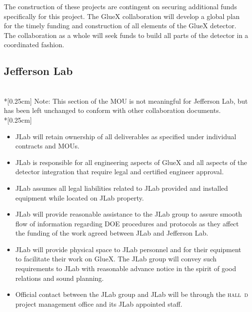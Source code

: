 \documentclass[oneside,12pt,letterpaper]{article}
\newcommand{\hd}{\mbox{\textsc{hall d}}}
\newcommand{\gx}{\mbox{GlueX}}
\newcommand{\instname}{Jefferson Lab}
\newcommand{\instabbr}{JLab}
\begin{document}
The construction of these projects are contingent
on securing additional funds specifically for this
project. The \gx{} collaboration will develop a global plan for the 
timely funding and construction of all elements of the \gx{} detector. 
The collaboration as a whole will seek funds to build all parts of the
detector in a coordinated fashion.

\subsection{Jefferson Lab}
~\\*[0.25cm]
Note: This section of the MOU is not meaningful for \instname, but has been
left unchanged to conform with other collaboration documents.
~\\*[0.25cm]
\begin{itemize}
\item JLab will retain ownership of all deliverables as specified 
under individual contracts and MOUs.
\item JLab is responsible for all engineering aspects of \gx{} and 
all aspects of the detector integration that require legal and certified
engineer approval.
\item JLab assumes all legal liabilities related to \instabbr{} provided
and installed equipment while located on JLab property.
\item JLab will provide reasonable assistance to the \instabbr{} group
to assure smooth flow of information regarding DOE procedures and 
protocols as they affect the funding of the work agreed between JLab
and \instname .
\item JLab will provide physical space to \instabbr{} personnel and for
their equipment to facilitate their work on \gx . The \instabbr{} group
will convey such requirements to JLab with reasonable advance notice
in the spirit of good relations and sound planning.
\item Official contact between the \instabbr{} group and JLab will be 
through the \hd{} project management office and its JLab appointed staff.
\end{itemize}
\end{document}
